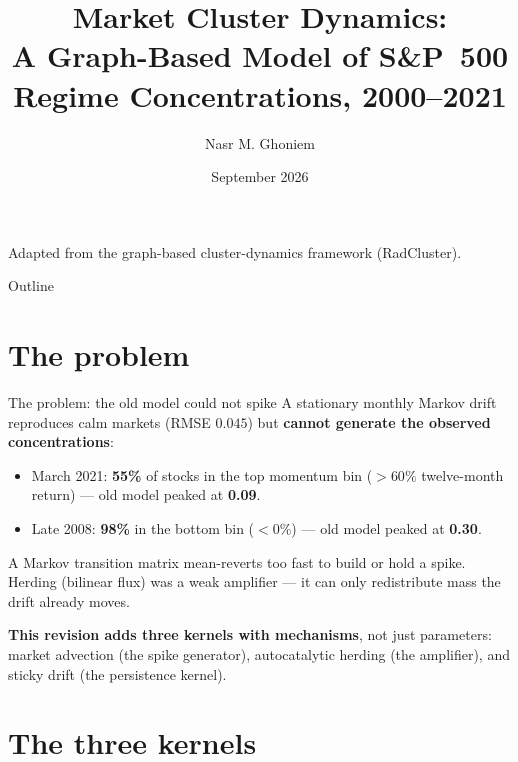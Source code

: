 \documentclass[10pt]{beamer}
\title[Market Dynamics]{Market Cluster Dynamics:\\ A Graph-Based Model of S\&P~500\\ Regime Concentrations, 2000--2021}
\author[N.M. Ghoniem]{Nasr M. Ghoniem}
\institute[UCLA]{Department of Mechanical \& Aerospace Engineering\\
University of California, Los Angeles}
\date[Sept 2026]{September 2026}
\begin{document}
\begin{frame}
  \titlepage
  \begin{center}
    \small\textcolor{nmgray}{Adapted from the graph-based cluster-dynamics framework (RadCluster).}
  \end{center}
\end{frame}

\begin{frame}{Outline}
  \tableofcontents
\end{frame}

\section{The problem}

\begin{frame}{The problem: the old model could not spike}
  \small
  A stationary monthly Markov drift reproduces calm markets (RMSE $0.045$)
  but \textbf{cannot generate the observed concentrations}:
  \begin{itemize}
    \item March 2021: \textbf{55\%} of stocks in the top momentum bin
      ($>60\%$ twelve-month return) --- old model peaked at \textbf{0.09}.
    \item Late 2008: \textbf{98\%} in the bottom bin ($<0\%$) ---
      old model peaked at \textbf{0.30}.
  \end{itemize}
  \vspace{0.6em}
  A Markov transition matrix mean-reverts too fast to build or hold a spike.
  Herding (bilinear flux) was a weak amplifier --- it can only redistribute
  mass the drift already moves.
  \vspace{0.6em}

  \textbf{This revision adds three kernels with mechanisms}, not just
  parameters: market advection (the spike generator), autocatalytic herding
  (the amplifier), and sticky drift (the persistence kernel).
\end{frame}

\section{The three kernels}
\end{document}
